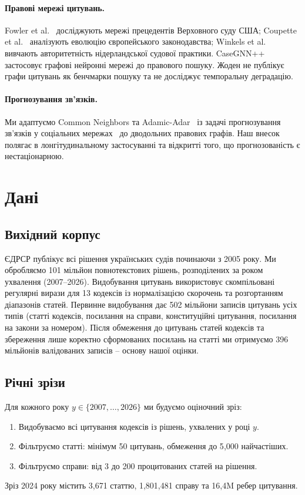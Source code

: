 \documentclass[11pt]{article}
\begin{document}
\paragraph{Правові мережі цитувань.}
Fowler et al.~\citep{fowler2007network} досліджують мережі прецедентів Верховного суду США; Coupette et al.~\citep{coupette2021measuring} аналізують еволюцію європейського законодавства; Winkels et al.~\citep{winkels2011determining} вивчають авторитетність нідерландської судової практики.
CaseGNN++~\citep{tang2024casegnn} застосовує графові нейронні мережі до правового пошуку.
Жоден не публікує графи цитувань як бенчмарки пошуку та не досліджує темпоральну деградацію.

\paragraph{Прогнозування зв'язків.}
Ми адаптуємо Common Neighbors та Adamic-Adar~\citep{adamic2003friends} із задачі прогнозування зв'язків у соціальних мережах~\citep{liben2007link} до дводольних правових графів.
Наш внесок полягає в лонгітудинальному застосуванні та відкритті того, що прогнозованість є нестаціонарною.
\section{Дані}
\label{sec:data}

\subsection{Вихідний корпус}

ЄДРСР публікує всі рішення українських судів починаючи з 2005 року.
Ми обробляємо 101 мільйон повнотекстових рішень, розподілених за роком ухвалення (2007–2026).
Видобування цитувань використовує скомпільовані регулярні вирази для 13 кодексів із нормалізацією скорочень та розгортанням діапазонів статей.
Первинне видобування дає 502 мільйони записів цитувань усіх типів (статті кодексів, посилання на справи, конституційні цитування, посилання на закони за номером).
Після обмеження до цитувань статей кодексів та збереження лише коректно сформованих посилань на статті ми отримуємо 396 мільйонів валідованих записів – основу нашої оцінки.

\subsection{Річні зрізи}

Для кожного року $y \in \{2007, \ldots, 2026\}$ ми будуємо оціночний зріз:
\begin{enumerate}[nosep,leftmargin=*]
  \item Видобуваємо всі цитування кодексів із рішень, ухвалених у році $y$.
  \item Фільтруємо статті: мінімум 50 цитувань, обмеження до 5{,}000 найчастіших.
  \item Фільтруємо справи: від 3 до 200 процитованих статей на рішення.
\end{enumerate}
Зріз 2024 року містить 3{,}671 статтю, 1{,}801{,}481 справу та 16,4M ребер цитування.
\end{document}
